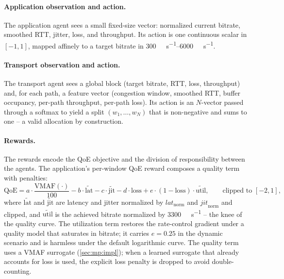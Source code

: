 \paragraph{Application observation and action.} The application agent sees a small fixed-size vector:
normalized current bitrate, smoothed RTT, jitter, loss, and throughput. Its action is one continuous
scalar in $[-1,1]$, mapped affinely to a target bitrate in \SIrange{300}{6000}{\kilo\bit\per\second}.

\paragraph{Transport observation and action.} The transport agent sees a global block (target bitrate,
RTT, loss, throughput) and, for each path, a feature vector (congestion window, smoothed RTT, buffer
occupancy, per-path throughput, per-path loss). Its action is an $N$-vector passed through a softmax to
yield a split $(w_1,\dots,w_N)$ that is non-negative and sums to one -- a valid allocation by
construction.

\paragraph{Rewards.} The rewards encode the QoE objective and the division of responsibility between the
agents. The application's per-window QoE reward composes a quality term with penalties:
\begin{equation}
\mathrm{QoE} = a\cdot\frac{\mathrm{VMAF}(\cdot)}{100}
             - b\cdot\widetilde{\mathrm{lat}}
             - c\cdot\widetilde{\mathrm{jit}}
             - d\cdot\mathrm{loss}
             + e\cdot(1-\mathrm{loss})\cdot\widetilde{\mathrm{util}},
\qquad \text{clipped to } [-2, 1],
\label{eq:p2qoe}
\end{equation}
where $\widetilde{\mathrm{lat}}$ and $\widetilde{\mathrm{jit}}$ are latency and jitter normalized by
$\mathit{lat}_{\mathrm{norm}}$ and $\mathit{jit}_{\mathrm{norm}}$ and clipped, and
$\widetilde{\mathrm{util}}$ is the achieved bitrate normalized by
\SI{3300}{\kilo\bit\per\second} -- the knee of the quality curve. The utilization term restores the
rate-control gradient under a quality model that saturates in bitrate; it carries $e = 0.25$ in the
dynamic scenario and is harmless under the default logarithmic curve. The quality term uses a VMAF
surrogate (\cref{sec:mp:impl}); when a learned surrogate that already accounts for loss is used, the
explicit loss penalty is dropped to avoid double-counting.

